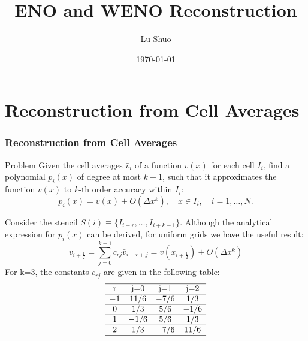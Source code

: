 \documentclass{beamer}
\title{ENO and WENO Reconstruction}
\author{Lu Shuo}
\date{\today}
\begin{document}
\frame{\titlepage}

\begin{frame}
    \tableofcontents
\end{frame}

\section{Reconstruction from Cell Averages}
\begin{frame}[allowframebreaks]
    \frametitle{Reconstruction from Cell Averages}
    \begin{block}{Problem}
        Given the cell averages \(\bar{v}_i\) of a function \(v(x)\) for each cell \(I_i\), find a polynomial \(p_i(x)\) of degree at most \(k-1\), such that it approximates the function \(v(x)\) to \(k\)-th order accuracy within \(I_i\):
        \[
            p_i(x) = v(x) + O(\Delta x^k), \quad x \in I_i, \quad i = 1,\ldots,N.
        \]
    \end{block}
    Consider the stencil \(S(i)\equiv \{I_{i-r},\ldots,I_{i+k-1}\} \). Although the analytical expression for \(p_i(x)\) can be derived, for uniform grids we have the useful result:
    \[
        v_{i+\frac{1}{2}} = \sum_{j=0}^{k-1}c_{rj}\bar{v}_{i-r+j} = v\left( x_{i+\frac{1}{2}} \right) + O(\Delta x^k)
    \]
    For k=3, the constants \(c_{rj}\) are given in the following table:
    \[
        \begin{array}{cccc}
            \hline
            \text{r} & \text{j=0} & \text{j=1} & \text{j=2} \\
            \hline
            -1       & 11/6       & -7/6       & 1/3        \\
            \hline
            0        & 1/3        & 5/6        & -1/6       \\
            \hline
            1        & -1/6       & 5/6        & 1/3        \\
            \hline
            2        & 1/3        & -7/6       & 11/6       \\
            \hline
        \end{array}
    \]
\end{frame}
\end{document}
